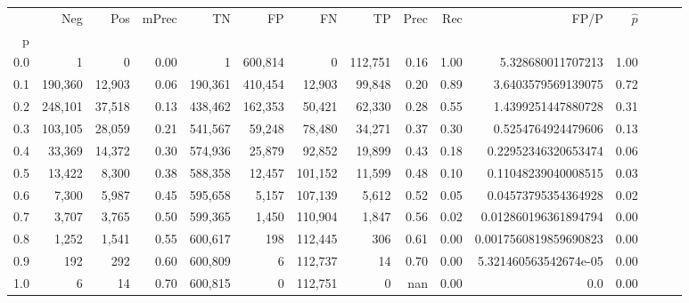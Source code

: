 \begin{tabular}{rrrrrrrrrrrrrrr}
\toprule
{} &      Neg &     Pos & mPrec &       TN &       FP &       FN &       TP &  Prec &   Rec &                   FP/P & $\hat{p}$ \\
p   &          &         &       &          &          &          &          &       &       &                        &           \\
\midrule
0.0 &        1 &       0 &  0.00 &        1 &  600,814 &        0 &  112,751 &  0.16 &  1.00 &      5.328680011707213 &      1.00 \\
0.1 &  190,360 &  12,903 &  0.06 &  190,361 &  410,454 &   12,903 &   99,848 &  0.20 &  0.89 &     3.6403579569139075 &      0.72 \\
0.2 &  248,101 &  37,518 &  0.13 &  438,462 &  162,353 &   50,421 &   62,330 &  0.28 &  0.55 &     1.4399251447880728 &      0.31 \\
0.3 &  103,105 &  28,059 &  0.21 &  541,567 &   59,248 &   78,480 &   34,271 &  0.37 &  0.30 &     0.5254764924479606 &      0.13 \\
0.4 &   33,369 &  14,372 &  0.30 &  574,936 &   25,879 &   92,852 &   19,899 &  0.43 &  0.18 &    0.22952346320653474 &      0.06 \\
0.5 &   13,422 &   8,300 &  0.38 &  588,358 &   12,457 &  101,152 &   11,599 &  0.48 &  0.10 &    0.11048239040008515 &      0.03 \\
0.6 &    7,300 &   5,987 &  0.45 &  595,658 &    5,157 &  107,139 &    5,612 &  0.52 &  0.05 &    0.04573795354364928 &      0.02 \\
0.7 &    3,707 &   3,765 &  0.50 &  599,365 &    1,450 &  110,904 &    1,847 &  0.56 &  0.02 &   0.012860196361894794 &      0.00 \\
0.8 &    1,252 &   1,541 &  0.55 &  600,617 &      198 &  112,445 &      306 &  0.61 &  0.00 &  0.0017560819859690823 &      0.00 \\
0.9 &      192 &     292 &  0.60 &  600,809 &        6 &  112,737 &       14 &  0.70 &  0.00 &  5.321460563542674e-05 &      0.00 \\
1.0 &        6 &      14 &  0.70 &  600,815 &        0 &  112,751 &        0 &   nan &  0.00 &                    0.0 &      0.00 \\
\bottomrule
\end{tabular}
